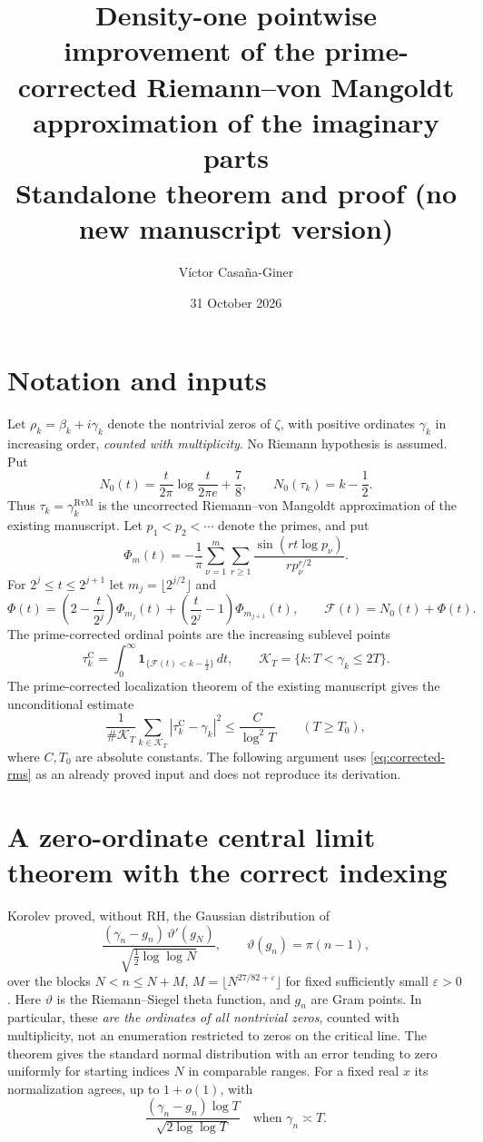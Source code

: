 \documentclass[11pt,a4paper]{article}
\title{Density-one pointwise improvement of the prime-corrected Riemann--von Mangoldt approximation of the imaginary parts\\\large Standalone theorem and proof (no new manuscript version)}
\author{V\'ictor Casa\~na-Giner}
\date{31 October 2026}
\newcommand{\KK}{\mathcal K_T}
\newcommand{\Nzero}{N_0}
\begin{document}
\maketitle
\section*{Notation and inputs}
Let $\rho_k=\beta_k+i\gamma_k$ denote the nontrivial zeros of $\zeta$, with positive ordinates $\gamma_k$ in increasing order, \emph{counted with multiplicity}. No Riemann hypothesis is assumed. Put
\[
\Nzero(t)=\frac{t}{2\pi}\log\frac{t}{2\pi e}+\frac78,
\qquad \Nzero(\tau_k)=k-\frac12.
\]
Thus $\tau_k=\gamma_k^{\mathrm{RvM}}$ is the uncorrected Riemann--von Mangoldt approximation of the existing manuscript. Let $p_1<p_2<\cdots$ denote the primes, and put
\[
\Phi_m(t)=-\frac1\pi\sum_{\nu=1}^{m}\sum_{r\ge1}
\frac{\sin(rt\log p_\nu)}{r p_\nu^{r/2}}.
\]
For $2^j\le t\le2^{j+1}$ let $m_j=\lfloor2^{j/2}\rfloor$ and
\[
\Phi(t)=\left(2-\frac t{2^j}\right)\Phi_{m_j}(t)
+\left(\frac t{2^j}-1\right)\Phi_{m_{j+1}}(t),
\qquad \mathcal F(t)=\Nzero(t)+\Phi(t).
\]
The prime-corrected ordinal points are the increasing sublevel points
\[
\tau_k^{\mathrm C}=
\int_0^\infty \mathbf 1_{\{\mathcal F(t)<k-\frac12\}}\,dt,
\qquad
\KK=\{k:T<\gamma_k\le 2T\}.
\]
The prime-corrected localization theorem of the existing manuscript gives the unconditional estimate
\begin{equation}
\frac1{\#\KK}\sum_{k\in\KK}
|\tau_k^{\mathrm C}-\gamma_k|^2\le\frac{C}{\log^2 T}
\qquad (T\ge T_0),
\label{eq:corrected-rms}
\end{equation}
where $C,T_0$ are absolute constants. The following argument uses \eqref{eq:corrected-rms} as an already proved input and does not reproduce its derivation.

\section*{A zero-ordinate central limit theorem with the correct indexing}
Korolev \cite[Theorem~10]{Korolev2012} proved, without RH, the Gaussian distribution of
\[
\frac{(\gamma_n-g_n)\,\vartheta'(g_N)}{\sqrt{\frac12\log\log N}},
\qquad\vartheta(g_n)=\pi(n-1),
\]
over the blocks $N<n\le N+M$, $M=\lfloor N^{27/82+\varepsilon}\rfloor$ for fixed sufficiently small $\varepsilon>0$. Here $\vartheta$ is the Riemann--Siegel theta function, and $g_n$ are Gram points. In particular, these \emph{are the ordinates of all nontrivial zeros}, counted with multiplicity, not an enumeration restricted to zeros on the critical line. The theorem gives the standard normal distribution with an error tending to zero uniformly for starting indices $N$ in comparable ranges. For a fixed real $x$ its normalization agrees, up to $1+o(1)$, with
\[
\frac{(\gamma_n-g_n)\log T}{\sqrt{2\log\log T}}
\quad\text{when }\gamma_n\asymp T.
\]
\end{document}
